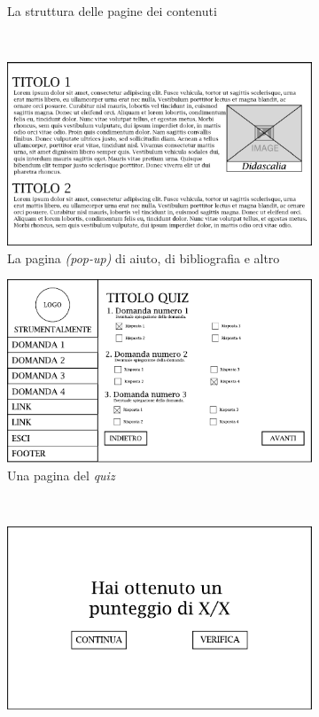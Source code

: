 \begin{figure}[H]
\begin{subfigure}[t]{0.5\textwidth}
		\caption{La struttura delle pagine dei contenuti}
	\end{subfigure}%
	~ 
	\begin{subfigure}[t]{0.5\textwidth}
		\centering
		\includegraphics[width=\textwidth]{gabbie_logiche/Aiuto}
		\caption{La pagina \emph{(pop-up)} di aiuto, di bibliografia e altro}
	\end{subfigure}
	\begin{subfigure}[t]{0.5\textwidth}
		\centering
		\includegraphics[width=\textwidth]{gabbie_logiche/Pagina_Quiz}
		\caption{Una pagina del \emph{quiz}}
	\end{subfigure}%
	~ 
	\begin{subfigure}[t]{0.5\textwidth}
		\centering
		\includegraphics[width=\textwidth]{gabbie_logiche/Risultati_Quiz}

\end{subfigure}
\end{figure}
